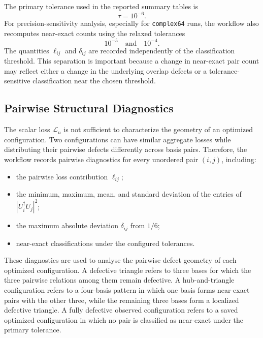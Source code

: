 \documentclass[a4paper,twocolumn,11pt,amsfonts,amssymb]{quantumarticle}
\begin{document}
The primary tolerance used in the reported summary tables is
\begin{equation*}
    \tau = 10^{-6}.
\end{equation*}
For precision-sensitivity analysis, especially for \texttt{complex64} runs, the workflow also recomputes near-exact counts using the relaxed tolerances
\begin{equation*}
    10^{-5}
    \quad \text{and} \quad
    10^{-4}.
\end{equation*}
The quantities \(\ell_{ij}\) and \(\delta_{ij}\) are recorded independently of the classification threshold. This separation is important because a change in near-exact pair count may reflect either a change in the underlying overlap defects or a tolerance-sensitive classification near the chosen threshold.

\subsection{Pairwise Structural Diagnostics}

The scalar loss \(\mathcal{L}_n\) is not sufficient to characterize the geometry of an optimized configuration. Two configurations can have similar aggregate losses while distributing their pairwise defects differently across basis pairs. Therefore, the workflow records pairwise diagnostics for every unordered pair \((i,j)\), including:
\begin{itemize}
    \item the pairwise loss contribution \(\ell_{ij}\);
    \item the minimum, maximum, mean, and standard deviation of the entries of \(|U_i^\dagger U_j|^2\);
    \item the maximum absolute deviation \(\delta_{ij}\) from \(1/6\);
    \item near-exact classifications under the configured tolerances.
\end{itemize}

These diagnostics are used to analyse the pairwise defect geometry of each optimized configuration. A defective triangle refers to three bases for which the three pairwise relations among them remain defective. A hub-and-triangle configuration refers to a four-basis pattern in which one basis forms near-exact pairs with the other three, while the remaining three bases form a localized defective triangle. A fully defective observed configuration refers to a saved optimized configuration in which no pair is classified as near-exact under the primary tolerance.
\end{document}
